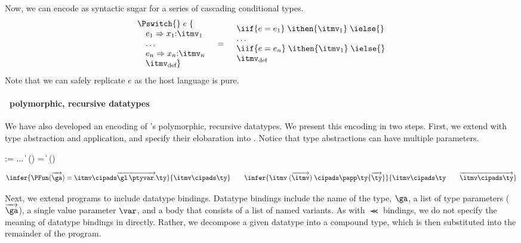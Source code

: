 Now, we can encode \Pswitch{} as syntactic sugar for a series of cascading
conditional types.
{\small
\[
\begin{array}{l}
\Pswitch{}\;e\;\{\\
\quad e_1 \Rightarrow x_1{:}\itmv_1\\ 
\quad \dots \\
\quad e_n \Rightarrow x_n{:}\itmv_n\\
\quad \itmv_{\text{def}} \}
\end{array}
\quad
 \mathbf{=}
\quad
\begin{array}{l} 
    \iif {e = e_1}\; \ithen {\itmv_1}\; \ielse{}\\
    \dots\\
    \iif {e = e_n}\; \ithen {\itmv_1}\; \ielse{}\\
    \itmv_{\text{def}}
\end{array}
\]}%
\noindent
Note that we can safely replicate $e$ as the
host language is pure.

\paragraph*{\padsml\ polymorphic, recursive datatypes}
We have also developed an encoding of \padsml{}'s polymorphic,
recursive datatypes. We present this encoding in two steps. First, we
extend \ipads{} with type abstraction and application, and specify
their elobaration into \ddc{}. Notice that \ipads{} type abstractions
can have multiple parameters.
\begin{bnf}
   \meta{\itmv} \::= ... \| 
\PFun{}\; (\overrightarrow \alpha) = \itmv
  \|   \itmv \; (\overrightarrow \itmv)

\end{bnf}
\[
  \infer{ 
     \PFun (\overrightarrow \ga) = \itmv \cipads \overrightarrow{\gl\,\ptyvar.}\ty
  }{
    \itmv \cipads \ty
  }
\qquad
  \infer{ 
     \itmv \; (\overrightarrow {\itmv}) \; \cipads \papp \ty
     {\overrightarrow {\ty}}
  }{
     \itmv \cipads \ty \qquad \overrightarrow {\itmv \cipads \ty}
  }
\]

Next, we extend \ipads{} programs to include datatype bindings.
Datatype bindings include the name of the type, $\ga$, a list of type
parameters ($\overrightarrow \ga$), a single value parameter $\var$, and a body
that consists of a list of named variants. As with $\Prec$ bindings,
we do not specify the meaning of datatype bindings in \ddc{} directly.
Rather, we decompose a given datatype into a compound \ipads{} type,
which is then substituted into the remainder of the program.

